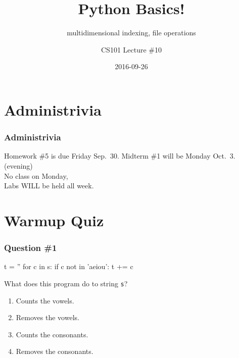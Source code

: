 \documentclass[11pt]{beamer}
\title{Python Basics!}
\subtitle{multidimensional indexing, file operations}
\author{CS101 Lecture \#10}
\date{2016-09-26}
\begin{document}
  \setcounter{showProgressBar}{0}
  \setcounter{showSlideNumbers}{0}

\frame{\titlepage}

\setcounter{framenumber}{0}
\setcounter{showProgressBar}{1}
\setcounter{showSlideNumbers}{1}

\section{Administrivia}

\begin{frame}
  \frametitle{Administrivia}
  \Enlarge
  \begin{itemize}
  \myitem  Homework \#5 is due Friday Sep.\ 30.
  \myitem  Midterm \#1 will be Monday Oct.\ 3.  (evening) \\ \textcolor{CS101GradBot}{No class on Monday, \\ Labs WILL be held all week.}
  \end{itemize}
\end{frame}

\section{Warmup Quiz}

\begin{frame}[fragile]
  \frametitle{Question \#1}
  \Enlarge

  \begin{semiverbatim}
t = ''
for c in s:
    if c not in 'aeiou':
        t += c
  \end{semiverbatim}
  What does this program do to string \texttt{s}?
  \begin{enumerate}[label=\Alph*]
  \item  Counts the vowels.
  \item  Removes the vowels.
  \item  Counts the consonants.
  \item  Removes the consonants.
  \end{enumerate}
\end{frame}
\end{document}
